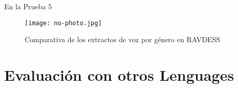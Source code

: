 \documentclass[11pt,a4paper,spanish]{book}
\begin{document}
	\Large En la Prueba 5
	
	
	\begin{figure}[H]
		\centering
		\texttt{[image: no-photo.jpg]} 
		\caption{Comparativa de los extractos de voz por género en RAVDESS}
		\label{fig:lstm-cnn}
	\end{figure}
	
	\section{Evaluación con otros Lenguages}

		
		
		
		
		
		
		

	\printbibliography
	
\end{document}
